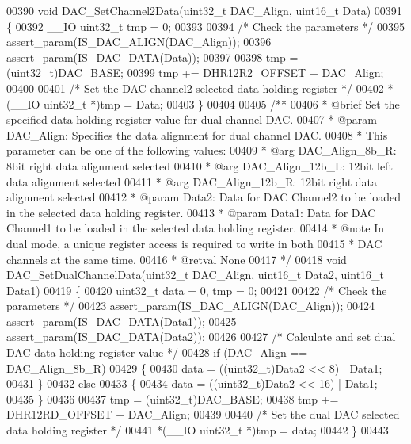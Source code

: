 \begin{DoxyCode}
00390 \textcolor{keywordtype}{void} DAC_SetChannel2Data(uint32\_t DAC\_Align, uint16\_t Data)
00391 \{
00392   \_\_IO uint32\_t tmp = 0;
00393 
00394   \textcolor{comment}{/* Check the parameters */}
00395   assert_param(IS\_DAC\_ALIGN(DAC\_Align));
00396   assert_param(IS\_DAC\_DATA(Data));
00397 
00398   tmp = (uint32\_t)DAC_BASE;
00399   tmp += DHR12R2_OFFSET + DAC\_Align;
00400 
00401   \textcolor{comment}{/* Set the DAC channel2 selected data holding register */}
00402   *(\_\_IO uint32\_t *)tmp = Data;
00403 \}
00404 
00405 \textcolor{comment}{/**}
00406 \textcolor{comment}{  * @brief  Set the specified data holding register value for dual channel DAC.}
00407 \textcolor{comment}{  * @param  DAC\_Align: Specifies the data alignment for dual channel DAC.}
00408 \textcolor{comment}{  *          This parameter can be one of the following values:}
00409 \textcolor{comment}{  *            @arg DAC\_Align\_8b\_R: 8bit right data alignment selected}
00410 \textcolor{comment}{  *            @arg DAC\_Align\_12b\_L: 12bit left data alignment selected}
00411 \textcolor{comment}{  *            @arg DAC\_Align\_12b\_R: 12bit right data alignment selected}
00412 \textcolor{comment}{  * @param  Data2: Data for DAC Channel2 to be loaded in the selected data holding register.}
00413 \textcolor{comment}{  * @param  Data1: Data for DAC Channel1 to be loaded in the selected data  holding register.}
00414 \textcolor{comment}{  * @note   In dual mode, a unique register access is required to write in both}
00415 \textcolor{comment}{  *          DAC channels at the same time.}
00416 \textcolor{comment}{  * @retval None}
00417 \textcolor{comment}{  */}
00418 \textcolor{keywordtype}{void} DAC_SetDualChannelData(uint32\_t DAC\_Align, uint16\_t Data2, uint16\_t Data1)
00419 \{
00420   uint32\_t data = 0, tmp = 0;
00421 
00422   \textcolor{comment}{/* Check the parameters */}
00423   assert_param(IS\_DAC\_ALIGN(DAC\_Align));
00424   assert_param(IS\_DAC\_DATA(Data1));
00425   assert_param(IS\_DAC\_DATA(Data2));
00426 
00427   \textcolor{comment}{/* Calculate and set dual DAC data holding register value */}
00428   \textcolor{keywordflow}{if} (DAC\_Align == DAC_Align_8b_R)
00429   \{
00430     data = ((uint32\_t)Data2 << 8) | Data1;
00431   \}
00432   \textcolor{keywordflow}{else}
00433   \{
00434     data = ((uint32\_t)Data2 << 16) | Data1;
00435   \}
00436 
00437   tmp = (uint32\_t)DAC_BASE;
00438   tmp += DHR12RD_OFFSET + DAC\_Align;
00439 
00440   \textcolor{comment}{/* Set the dual DAC selected data holding register */}
00441   *(\_\_IO uint32\_t *)tmp = data;
00442 \}
00443 

\end{DoxyCode}
